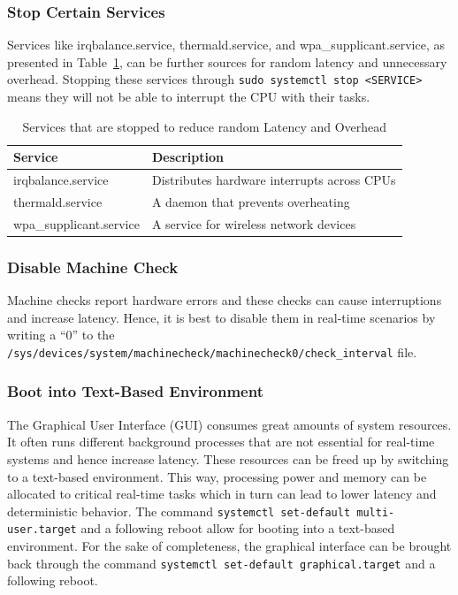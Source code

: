 \documentclass[MMR,Master,english]{style/twbook}
\begin{document}
\clearpage

\subsubsection{Stop Certain Services}
Services like irqbalance.service, thermald.service, and wpa\_supplicant.service, as presented in Table~\ref{tab:stop_servies}, can be further sources for random latency and unnecessary overhead. Stopping these services through \texttt{sudo systemctl stop <SERVICE>} means they will not be able to interrupt the CPU with their tasks.

\begin{table}[H]
	\centering
	\caption{Services that are stopped to reduce random Latency and Overhead}
	\label{tab:stop_servies}
	\setlength{\tabcolsep}{0.5em} %
	{\renewcommand{\arraystretch}{1.2}%
		\begin{tabular}{|l|l|}
			\hline
			\textbf{Service}        & \textbf{Description}                        \\
			\hline
			irqbalance.service      & Distributes hardware interrupts across CPUs \\\hline
			thermald.service        & A daemon that prevents overheating          \\\hline
			wpa\_supplicant.service & A service for wireless network devices      \\
			\hline
		\end{tabular}}
\end{table}

\subsubsection{Disable Machine Check}
Machine checks report hardware errors and these checks can cause interruptions and increase latency. Hence, it is best to disable them in real-time scenarios by writing a ``0'' to the \texttt{/sys/devices/system/machinecheck/machinecheck0/check\_interval} file.

\subsubsection{Boot into Text-Based Environment}
The Graphical User Interface (GUI) consumes great amounts of system resources. It often runs different background processes that are not essential for real-time systems and hence increase latency. These resources can be freed up by switching to a text-based environment. This way, processing power and memory can be allocated to critical real-time tasks which in turn can lead to lower latency and deterministic behavior. The command \texttt{systemctl set-default multi-user.target} and a following reboot allow for booting into a text-based environment. For the sake of completeness, the graphical interface can be brought back through the command \texttt{systemctl set-default graphical.target} and a following reboot.
\end{document}
